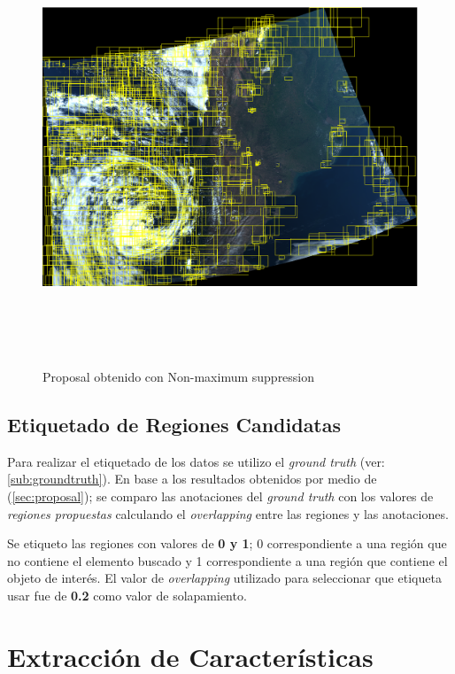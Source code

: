 \begin{figure}[H]
 \centering
  \includegraphics[height=13cm,keepaspectratio=true,clip=true]{imagenes/Logos/proposalconNMS.png}
  \caption{Proposal obtenido con Non-maximum suppression}
	\label{Fig: proposalnms}
\end{figure}


\subsection{Etiquetado de Regiones Candidatas}\label{sub:etiquetado}

Para realizar el etiquetado de los datos se utilizo el \textit{ground truth} (ver: \ref{sub:groundtruth}). En base a los resultados obtenidos por medio de (\ref{sec:proposal}); se comparo las anotaciones del \textit{ground truth} con los valores de \textit{regiones propuestas} calculando el \textit{overlapping} entre las regiones y las anotaciones.

Se etiqueto las regiones con valores de \textbf{0 y 1}; 0 correspondiente a una región que no contiene el elemento buscado y 1 correspondiente a una región  que contiene el objeto de interés. El valor de \textit{overlapping} utilizado para seleccionar que etiqueta usar fue de \textbf{0.2} como valor de  solapamiento.

\section{Extracción de Características}\label{sec:extracciondecaracteristica}

